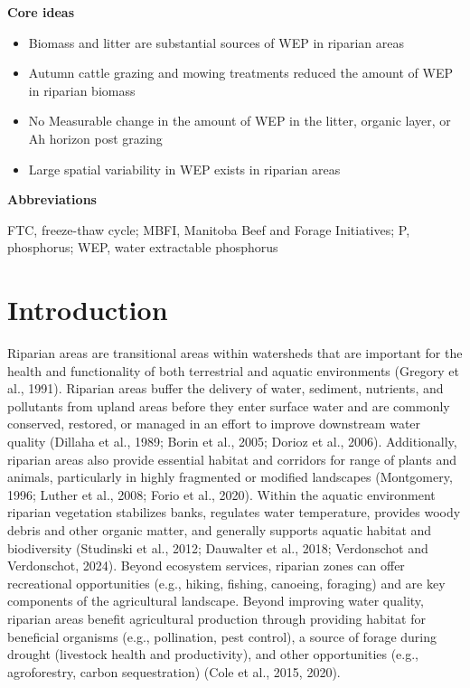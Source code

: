 \documentclass[
]{agujournal2019}
\providecommand{\tightlist}{%
  \setlength{\itemsep}{0pt}\setlength{\parskip}{0pt}}\usepackage{longtable,booktabs,array}
\begin{document}
\textbf{Core ideas}

\begin{itemize}
\tightlist
\item
  Biomass and litter are substantial sources of WEP in riparian areas
\item
  Autumn cattle grazing and mowing treatments reduced the amount of WEP
  in riparian biomass
\item
  No Measurable change in the amount of WEP in the litter, organic
  layer, or Ah horizon post grazing
\item
  Large spatial variability in WEP exists in riparian areas
\end{itemize}

\textbf{Abbreviations}

FTC, freeze-thaw cycle; MBFI, Manitoba Beef and Forage Initiatives; P,
phosphorus; WEP, water extractable phosphorus

\section{Introduction}\label{introduction}

Riparian areas are transitional areas within watersheds that are
important for the health and functionality of both terrestrial and
aquatic environments (Gregory et al., 1991). Riparian areas buffer the
delivery of water, sediment, nutrients, and pollutants from upland areas
before they enter surface water and are commonly conserved, restored, or
managed in an effort to improve downstream water quality (Dillaha et
al., 1989; Borin et al., 2005; Dorioz et al., 2006). Additionally,
riparian areas also provide essential habitat and corridors for range of
plants and animals, particularly in highly fragmented or modified
landscapes (Montgomery, 1996; Luther et al., 2008; Forio et al., 2020).
Within the aquatic environment riparian vegetation stabilizes banks,
regulates water temperature, provides woody debris and other organic
matter, and generally supports aquatic habitat and biodiversity
(Studinski et al., 2012; Dauwalter et al., 2018; Verdonschot and
Verdonschot, 2024). Beyond ecosystem services, riparian zones can offer
recreational opportunities (e.g., hiking, fishing, canoeing, foraging)
and are key components of the agricultural landscape. Beyond improving
water quality, riparian areas benefit agricultural production through
providing habitat for beneficial organisms (e.g., pollination, pest
control), a source of forage during drought (livestock health and
productivity), and other opportunities (e.g., agroforestry, carbon
sequestration) (Cole et al., 2015, 2020).
\end{document}
